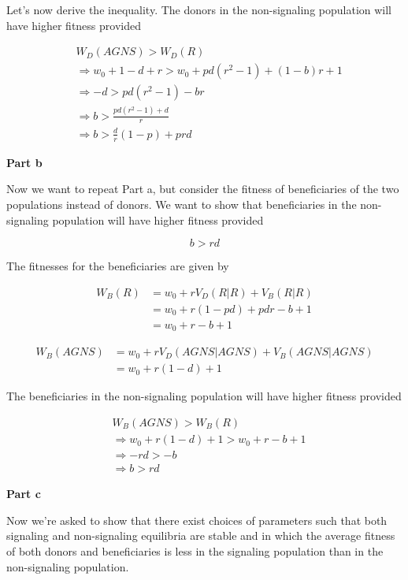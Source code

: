 \documentclass{article}
\begin{document}
Let's now derive the inequality. The donors in the non-signaling
population will have higher fitness provided

\begin{align*}
    &W_D(AGNS) > W_D(R) \\
    &\Rightarrow w_0 + 1 - d + r > w_0 + p d (r^2 - 1) + (1 - b) r + 1 \\
    &\Rightarrow - d > p d (r^2 - 1) - b r \\
    &\Rightarrow b > \frac{p d (r^2 - 1) + d}{r} \\
    &\Rightarrow b > \frac{d}{r} (1 - p) + p r d
\end{align*}

\textbf{Part b}

Now we want to repeat Part a, but consider the fitness of beneficiaries
of the two populations instead of donors. We want to show that
beneficiaries in the non-signaling population will have higher fitness
provided

\begin{equation*}
    b > r d
\end{equation*}

The fitnesses for the beneficiaries are given by

\begin{align*}
    W_B(R) &= w_0 + r V_D(R|R) + V_B(R|R) \\
           &= w_0 + r (1 - p d) + p d r - b + 1 \\
           &= w_0 + r - b + 1
\end{align*}

\begin{align*}
    W_B(AGNS) &= w_0 + r V_D(AGNS|AGNS) + V_B(AGNS|AGNS) \\
              &= w_0 + r (1 - d) + 1
\end{align*}

The beneficiaries in the non-signaling population will have higher
fitness provided

\begin{align*}
    &W_B(AGNS) > W_B(R) \\
    &\Rightarrow w_0 + r (1 - d) + 1 > w_0 + r - b + 1 \\
    &\Rightarrow - r d > - b \\
    &\Rightarrow b > r d
\end{align*}

\textbf{Part c}

Now we're asked to show that there exist choices of parameters such that
both signaling and non-signaling equilibria are stable and in which the
average fitness of both donors and beneficiaries is less in the
signaling population than in the non-signaling population.
\end{document}
